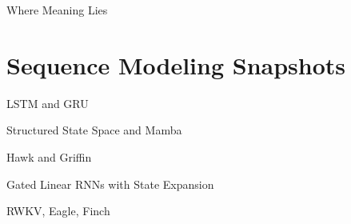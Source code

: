 
\begin{slide}[\slideopts,toc={Hypersphere}]{Where Meaning Lies}
\vspace{-1em}
\end{slide}

\section[\sectopts,toc={History Samples}]{Sequence Modeling Snapshots}

\begin{slidewhite}[\slideopts, toc={LSTM \& GRU}]{LSTM and GRU}
\vspace{-6em}
\end{slidewhite}

\begin{slidewhite}[\slideopts, toc={SSM \& Mamba}]{Structured State Space and Mamba}
\vspace{-6em}
\end{slidewhite}

\begin{slidewhite}[\slideopts,toc={Hawk \& Griffin}]{Hawk and Griffin}
\vspace{-6em}
\end{slidewhite}

\begin{slidewhite}[\slideopts,toc={HGRN2}]{Gated Linear RNNs with State Expansion}
\vspace{-6em}
\end{slidewhite}

\begin{slidewhite}[\slideopts,toc={RWKV+}]{RWKV, Eagle, Finch}
\vspace{-6em}
\end{slidewhite}


%
%
%
%


\endinput
